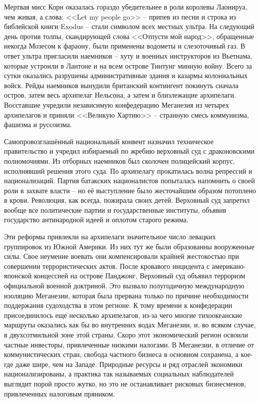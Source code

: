 Мертвая мисс Корн оказалась гораздо убедительнее в роли королевы Лаонируа, чем живая, а слова: <<Let my people go>> -- припев из песни и строка из библейской книги Exodus -- стали символом всех местных ультра. На следующий день против толпы, скандирующей слова <<Отпусти мой народ>>, обращенные некогда Мозесом к фараону, были применены водометы и слезоточивый газ. В ответ ультра пригласили наемников -- хуту и военных инструкторов из Вьетнама, которые устроили в Лантоне и на всем острове Тинтунг минную войну. Всего за сутки оказались разрушены административные здания и казармы колониальных войск. Рейды наемников вынудили британский контингент покинуть сначала остров, затем весь архипелаг Нельсона, а затем и близлежащие архипелаги. Восставшие учредили независимую конфедерацию Меганезия из четырех архипелагов и приняли <<Великую Хартию>> -- странную смесь коммунизма, фашизма и руссоизма.

Самопровозглашённый национальный конвент назначил техническое правительство и учредил избираемый по жребию верховный суд с драконовскими полномочиями. Из отборных наемников был сколочен полицейский корпус, исполнявший решения этого суда. По архипелагу прокатилась волна репрессий и национализаций. Партия батакских националистов попыталась напомнить о своей роли в захвате власти -- но её выступление было жесточайшим образом потоплено в крови. Революция, как всегда, пожирала своих детей. Верховный суд запретил вообще все политические партии и государственные институты, объявив государство антинародной идеей и оплотом старого режима.

Эти реформы привлекли на архипелаги значительное число левацких группировок из Южной Америки. Из них тут же были образованны вооруженные силы. Свое неумение воевать они компенсировали крайней жестокостью при совершении террористических актов. После кровавого инцидента с американо-японской концессией на острове Панджонг, Верховный суд объявил терроризм официальной военной доктриной. Это вызвало полугодичную международную изоляцию Меганезии, которая была прервана только по причине необходимости поддержания судоходства в этом регионе. К тому времени к конфедерации присоединилось еще несколько архипелагов, из-за чего многие тихоокеанские маршруты оказались как бы во внутренних водах Меганезии, и, во всяком случае, в двухсотмильной зоне этой страны. Скоро этот экономический регион освоили частные инвесторы, привлеченные низкими налогами. В Меганезии, в отличие от коммунистических стран, свобода частного бизнеса в основном сохранена, а кое-где даже шире, чем на Западе. Природные ресурсы и ряд отраслей экономики национализированы, а практика так называемых социальных наблюдателей выглядит порой просто жутко, но это не останавливает рисковых бизнесменов, привлеченных налоговым пряником.

